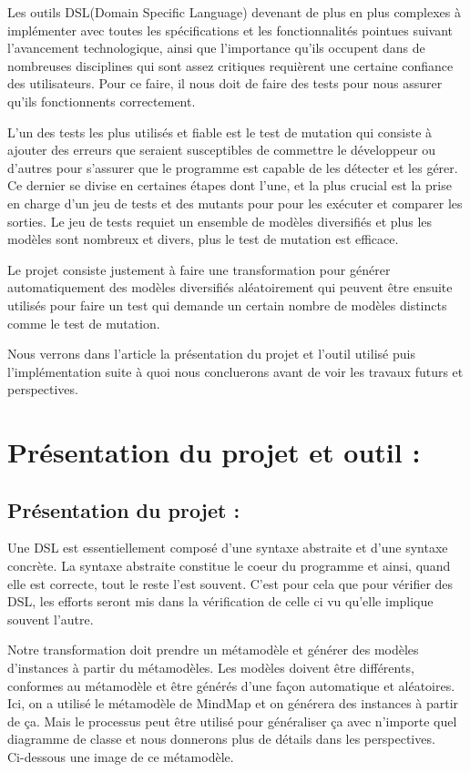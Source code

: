 \documentclass[french]{article}
\begin{document}
\hspace{10 mm} Les outils DSL(Domain Specific Language) devenant de plus en plus complexes à implémenter avec toutes les spécifications et les fonctionnalités pointues suivant l'avancement technologique, ainsi que l'importance qu'ils occupent dans de nombreuses disciplines qui sont assez critiques requièrent une certaine confiance des utilisateurs. Pour ce faire, il nous doit de faire des tests pour nous assurer qu'ils fonctionnents correctement. 
			\par 
			L'un des tests les plus utilisés et fiable est le test de mutation qui consiste à ajouter des erreurs que seraient susceptibles de commettre le développeur ou d'autres pour s'assurer que le programme est capable de les détecter et les gérer. Ce dernier se divise en certaines étapes dont l'une, et la plus crucial est la prise en charge d'un jeu de tests et des mutants pour pour les exécuter et comparer les sorties. Le jeu de tests requiet un ensemble de modèles diversifiés et plus les modèles sont nombreux et divers, plus le test de mutation est efficace. 
			 \par
			 Le projet consiste justement à faire une transformation pour générer automatiquement des modèles diversifiés aléatoirement qui peuvent être ensuite utilisés pour faire un test qui demande un certain nombre de modèles distincts comme le test de mutation.
		 
		 Nous verrons dans l'article la présentation du projet et l'outil utilisé puis l'implémentation suite à quoi nous concluerons avant de voir les travaux futurs et perspectives.	

\newpage
	 	
		
\section{Présentation du projet et outil :}
\subsection{Présentation du projet :}

\hspace{10 mm} Une DSL est essentiellement composé d'une syntaxe abstraite et d'une syntaxe concrète. La syntaxe abstraite constitue le coeur du programme et ainsi, quand elle est correcte, tout le reste l'est souvent. C'est pour cela que pour vérifier des DSL, les efforts seront mis dans la vérification de celle ci vu qu'elle implique souvent l'autre.
	\par Notre transformation doit prendre un métamodèle et générer des modèles d'instances à partir du métamodèles. Les modèles doivent être différents, conformes au métamodèle et être générés d'une façon automatique et aléatoires. Ici, on a utilisé le métamodèle de MindMap et on générera des instances à partir de ça. Mais le processus peut être utilisé pour généraliser ça avec n'importe quel diagramme de classe et nous donnerons plus de détails dans les perspectives.\\
	 Ci-dessous une image de ce métamodèle.
	
\end{document}
